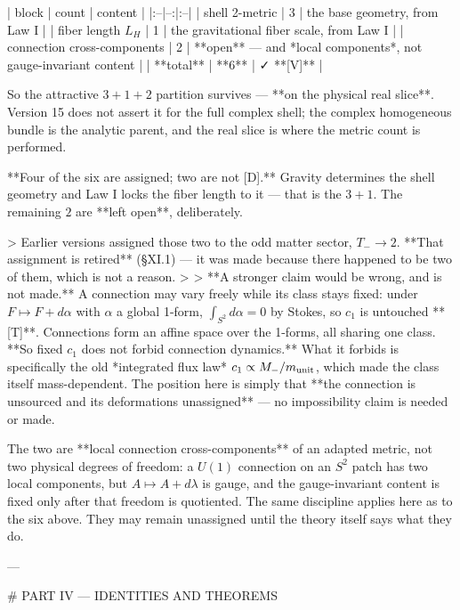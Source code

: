 | block | count | content |
|:--|--:|:--|
| shell 2-metric | 3 | the base geometry, from Law I |
| fiber length $L_H$ | 1 | the gravitational fiber scale, from Law I |
| connection cross-components | 2 | **open** — and *local components*, not gauge-invariant content |
| **total** | **6** | ✓ **[V]** |

So the attractive $3+1+2$ partition survives — **on the physical real slice**. Version 15 does not assert it for the full complex shell; the complex homogeneous bundle is the analytic parent, and the real slice is where the metric count is performed.

**Four of the six are assigned; two are not [D].** Gravity determines the shell geometry and Law I locks the fiber length to it — that is the $3+1$. The remaining $2$ are **left open**, deliberately.

> Earlier versions assigned those two to the odd matter sector, $T_-\to2$. **That assignment is retired** (§XI.1) — it was made because there happened to be two of them, which is not a reason.
>
> **A stronger claim would be wrong, and is not made.** A connection may vary freely while its class stays fixed: under $F\mapsto F+d\alpha$ with $\alpha$ a global 1-form, $\int_{S^2}d\alpha = 0$ by Stokes, so $c_1$ is untouched **[T]**. Connections form an affine space over the 1-forms, all sharing one class. **So fixed $c_1$ does not forbid connection dynamics.** What it forbids is specifically the old *integrated flux law* $c_1\propto M_-/m_{\rm unit}$, which made the class itself mass-dependent. The position here is simply that **the connection is unsourced and its deformations unassigned** — no impossibility claim is needed or made.

The two are **local connection cross-components** of an adapted metric, not two physical degrees of freedom: a $U(1)$ connection on an $S^2$ patch has two local components, but $A\mapsto A+d\lambda$ is gauge, and the gauge-invariant content is fixed only after that freedom is quotiented. The same discipline applies here as to the six above. They may remain unassigned until the theory itself says what they do.

---

# PART IV — IDENTITIES AND THEOREMS


